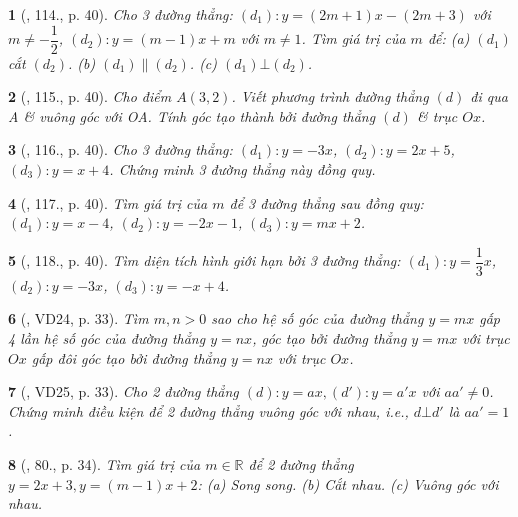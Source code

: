 \documentclass{article}
\newtheorem{baitoan}{}
\begin{document}
\begin{baitoan}[\cite{Tuyen_Toan_9_old}, 114., p. 40]
	Cho 3 đường thẳng: $(d_1):y = (2m + 1)x - (2m + 3)$ với $m\ne-\dfrac{1}{2}$, $(d_2):y = (m - 1)x + m$ với $m\ne1$. Tìm giá trị của $m$ để: (a) $(d_1)$ cắt $(d_2)$. (b) $(d_1)\parallel(d_2)$. (c) $(d_1)\bot(d_2)$.
\end{baitoan}

\begin{baitoan}[\cite{Tuyen_Toan_9_old}, 115., p. 40]
	Cho điểm $A(3,2)$. Viết phương trình đường thẳng $(d)$ đi qua A \& vuông góc với OA. Tính góc tạo thành bởi đường thẳng $(d)$ \& trục $Ox$.
\end{baitoan}

\begin{baitoan}[\cite{Tuyen_Toan_9_old}, 116., p. 40]
	Cho 3 đường thẳng: $(d_1):y = -3x$, $(d_2):y = 2x + 5$, $(d_3):y = x + 4$. Chứng minh 3 đường thẳng này đồng quy.
\end{baitoan}

\begin{baitoan}[\cite{Tuyen_Toan_9_old}, 117., p. 40]
	Tìm giá trị của $m$ để 3 đường thẳng sau đồng quy: $(d_1):y = x - 4$, $(d_2):y = -2x - 1$, $(d_3):y = mx + 2$.
\end{baitoan}

\begin{baitoan}[\cite{Tuyen_Toan_9_old}, 118., p. 40]
	Tìm diện tích hình giới hạn bởi 3 đường thẳng: $(d_1):y = \dfrac{1}{3}x$, $(d_2):y = -3x$, $(d_3):y = -x + 4$.
\end{baitoan}

\begin{baitoan}[\cite{Binh_Toan_9_tap_1}, VD24, p. 33]
	Tìm $m,n > 0$ sao cho hệ số góc của đường thẳng $y = mx$ gấp 4 lần hệ số góc của đường thẳng $y = nx$, góc tạo bởi đường thẳng $y = mx$ với trục $Ox$ gấp đôi góc tạo bởi đường thẳng $y = nx$ với trục $Ox$.
\end{baitoan}

\begin{baitoan}[\cite{Binh_Toan_9_tap_1}, VD25, p. 33]
	Cho 2 đường thẳng $(d):y = ax,(d'):y = a'x$ với $aa'\ne0$. Chứng minh điều kiện để 2 đường thẳng vuông góc với nhau, i.e., $d\bot d'$ là $aa' = 1$.
\end{baitoan}

\begin{baitoan}[\cite{Binh_Toan_9_tap_1}, 80., p. 34]
	Tìm giá trị của $m\in\mathbb{R}$ để 2 đường thẳng $y = 2x + 3,y = (m - 1)x + 2$: (a) Song song. (b) Cắt nhau. (c) Vuông góc với nhau.
\end{baitoan}
\end{document}
